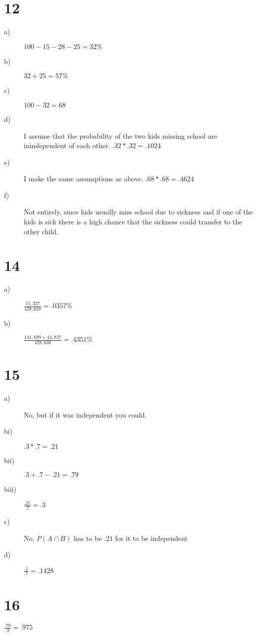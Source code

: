 \documentclass[12pt]{article}
\begin{document}
\section*{12}
\begin{description}
\item[a)] $100 - 15 - 28 - 25 = 32\%$
\item[b)] $32 + 25 = 57\%$
\item[c)] $100 - 32 = 68$
\item[d)] I assume that the probability of the two kids missing school are 
    inindependent of each other. $.32 * .32 = .1024$
\item[e)] I make the same assumptions as above. $.68 * .68 = .4624$
\item[f)] Not entirely, since kids usually miss school due to sickness and if 
    one of the kids is sick there is a high chance that the sickness could 
    transfer to the other child.
\end{description}

\section*{14}
\begin{description}
\item[a)] $\frac{15,327}{428,638} = .0357\%$ 
\item[b)] $\frac{141,699 + 44,837}{428,638} = .4351\%$
   \end{description}

\section*{15}
\begin{description}
\item[a)] No, but if it was independent you could.
\item[bi)] $.3*.7=.21$
\item[bii)] $.3 + .7 - .21 = .79$ 
\item[biii)] $\frac{.21}{.7} = .3$
\item[c)] No, $P(A \cap B)$ has to be $.21$ for it to be independent
\item[d)] $\frac{.1}{.7} = .1428$
\end{description}

\section*{16}
$\frac{.78}{.8} = .975$
\end{document}
